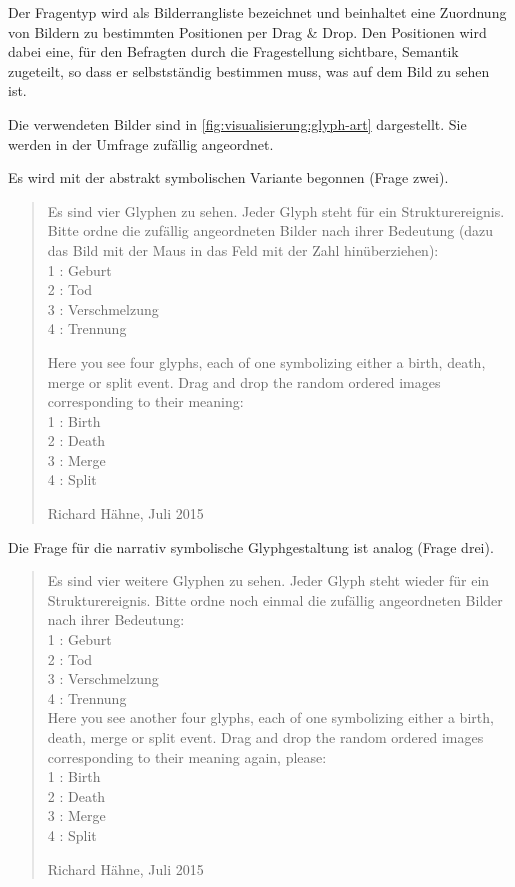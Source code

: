 Der Fragentyp wird als Bilderrangliste bezeichnet und beinhaltet eine Zuordnung von Bildern zu bestimmten Positionen per Drag \& Drop. Den Positionen wird dabei eine, für den Befragten durch die Fragestellung sichtbare, Semantik zugeteilt, so dass er selbstständig bestimmen muss, was auf dem Bild zu sehen ist.

Die verwendeten Bilder sind in \autoref{fig:visualisierung:glyph-art} dargestellt. Sie werden in der Umfrage zufällig angeordnet.

Es wird mit der abstrakt symbolischen Variante begonnen (Frage zwei).

\blockquote[Richard Hähne, Juli 2015]{
	Es sind vier Glyphen zu sehen. Jeder Glyph steht für ein Strukturereignis. Bitte ordne die zufällig angeordneten Bilder nach ihrer Bedeutung (dazu das Bild mit der Maus in das Feld mit der Zahl hinüberziehen):\\
	1 : Geburt\\
	2 : Tod\\
	3 : Verschmelzung\\
	4 : Trennung
	
	Here you see four glyphs, each of one symbolizing either a birth, death, merge or split event. Drag and drop the random ordered images corresponding to their meaning:\\
	1 : Birth\\
	2 : Death\\
	3 : Merge\\
	4 : Split
}

Die Frage für die narrativ symbolische Glyphgestaltung ist analog (Frage drei).
\blockquote[Richard Hähne, Juli 2015]{
	Es sind vier weitere Glyphen zu sehen. Jeder Glyph steht wieder für ein Strukturereignis. Bitte ordne noch einmal die zufällig angeordneten Bilder nach ihrer Bedeutung:\\
	1 : Geburt\\
	2 : Tod\\
	3 : Verschmelzung\\
	4 : Trennung\\
	
	Here you see another four glyphs, each of one symbolizing either a birth, death, merge or split event. Drag and drop the random ordered images corresponding to their meaning again, please:\\
	1 : Birth\\
	2 : Death\\
	3 : Merge\\
	4 : Split
}


